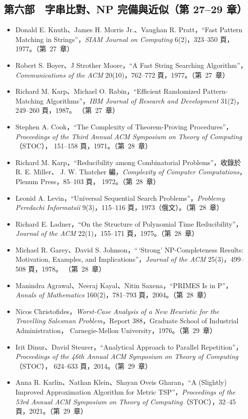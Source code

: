 \subsection*{第六部　字串比對、NP 完備與近似（第 27--29 章）}

\begin{itemize}
\item Donald E. Knuth、James H. Morris Jr.、Vaughan R. Pratt，``Fast Pattern Matching in
Strings''，\textit{SIAM Journal on Computing} 6(2)，323--350 頁，1977。（第~27~章）
\item Robert S. Boyer、J Strother Moore，``A Fast String Searching Algorithm''，
\textit{Communications of the ACM} 20(10)，762--772 頁，1977。（第~27~章）
\item Richard M. Karp、Michael O. Rabin，``Efficient Randomized Pattern-Matching
Algorithms''，\textit{IBM Journal of Research and Development} 31(2)，249--260 頁，1987。
（第~27~章）
\item Stephen A. Cook，``The Complexity of Theorem-Proving Procedures''，
\textit{Proceedings of the Third Annual ACM Symposium on Theory of Computing}（STOC），
151--158 頁，1971。（第~28~章）
\item Richard M. Karp，``Reducibility among Combinatorial Problems''，收錄於 R. E. Miller、
J. W. Thatcher 編，\textit{Complexity of Computer Computations}，Plenum Press，85--103 頁，
1972。（第~28~章）
\item Leonid A. Levin，``Universal Sequential Search Problems''，\textit{Problemy Peredachi
Informatsii} 9(3)，115--116 頁，1973（俄文）。（第~28~章）
\item Richard E. Ladner，``On the Structure of Polynomial Time Reducibility''，
\textit{Journal of the ACM} 22(1)，155--171 頁，1975。（第~28~章）
\item Michael R. Garey、David S. Johnson，``\,`Strong' NP-Completeness Results: Motivation,
Examples, and Implications''，\textit{Journal of the ACM} 25(3)，499--508 頁，1978。
（第~28~章）
\item Manindra Agrawal、Neeraj Kayal、Nitin Saxena，``PRIMES Is in P''，\textit{Annals
of Mathematics} 160(2)，781--793 頁，2004。（第~28~章）
\item Nicos Christofides，\textit{Worst-Case Analysis of a New Heuristic for the
Travelling Salesman Problem}，Report 388，Graduate School of Industrial Administration，
Carnegie-Mellon University，1976。（第~29~章）
\item Irit Dinur、David Steurer，``Analytical Approach to Parallel Repetition''，
\textit{Proceedings of the 46th Annual ACM Symposium on Theory of Computing}（STOC），
624--633 頁，2014。（第~29~章）
\item Anna R. Karlin、Nathan Klein、Shayan Oveis Gharan，``A (Slightly) Improved
Approximation Algorithm for Metric TSP''，\textit{Proceedings of the 53rd Annual ACM
Symposium on Theory of Computing}（STOC），32--45 頁，2021。（第~29~章）
\end{itemize}
